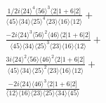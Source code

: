 \documentclass[varwidth, border=5pt]{standalone}
\begin{document}
\begin{my}
$\begin{gathered}
\scriptscriptstyle\frac{1/2i\langle24\rangle^4\langle56\rangle^3\langle2|1+6|2]}{\langle45\rangle\langle34\rangle\langle25\rangle^4\langle23\rangle\langle16\rangle\langle12\rangle}+\\
\scriptscriptstyle\frac{-2i\langle24\rangle^3\langle56\rangle^2\langle46\rangle\langle2|1+6|2]}{\langle45\rangle\langle34\rangle\langle25\rangle^3\langle23\rangle\langle16\rangle\langle12\rangle}+\\
\scriptscriptstyle\frac{3i\langle24\rangle^2\langle56\rangle\langle46\rangle^2\langle2|1+6|2]}{\langle45\rangle\langle34\rangle\langle25\rangle^2\langle23\rangle\langle16\rangle\langle12\rangle}+\\
\scriptscriptstyle\frac{-2i\langle24\rangle\langle46\rangle^3\langle2|1+6|2]}{\langle12\rangle\langle16\rangle\langle23\rangle\langle25\rangle\langle34\rangle\langle45\rangle}\phantom{+}
\end{gathered}$
\end{my}
\end{document}
